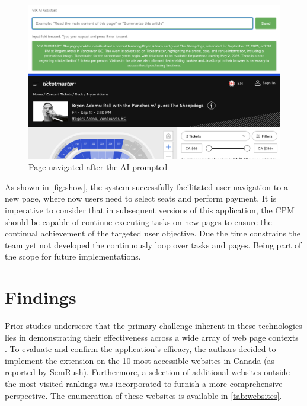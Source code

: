 \documentclass[conference]{IEEEtran}
\begin{document}
\begin{figure}[h]
\centering
\includegraphics[width=\columnwidth]{images/4.png}
\caption{Page navigated after the AI prompted}
\label{fig:show}
\end{figure}

As shown in \autoref{fig:show}, the system successfully facilitated user navigation to a new page, where now users need to select seats and perform payment. It is imperative to consider that in subsequent versions of this application, the CPM should be capable of continue executing tasks on new pages to ensure the continual achievement of the targeted user objective. Due the time constrains the team yet not developed the continuously loop over tasks and pages. Being part of the scope for future implementations.


\section{Findings}

Prior studies underscore that the primary challenge inherent in these technologies lies in demonstrating their effectiveness across a wide array of web page contexts \cite{prakash2024, he2024webvoyager}. To evaluate and confirm the application's efficacy, the authors decided to implement the extension on the 10 most accessible websites in Canada (as reported by SemRush). Furthermore, a selection of additional websites outside the most visited rankings was incorporated to furnish a more comprehensive perspective. The enumeration of these websites is available in \autoref{tab:websites}.
\end{document}
